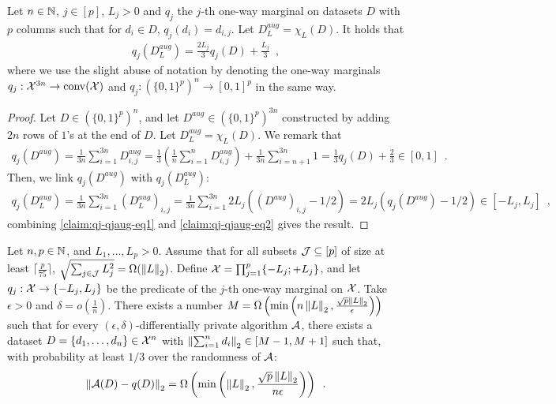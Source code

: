 \begin{claim}
  \label{claim:qj-qjaug}
  Let $n \in \mathbb N$, $j \in [p]$, $L_j > 0$ and $q_j$ the $j$-th one-way marginal
  on datasets $D$ with $p$ columns such that for $d_i \in D$, $q_j(d_i) = d_{i,j}$.
  Let $D_L^{aug} = \chi_L(D)$.
  It holds that
  \begin{align}
    q_j(D_L^{aug}) = \frac{2L_j}{3} q_j(D) + \frac{L_j}{3}\enspace,
  \end{align}
  where we use the slight abuse of notation by denoting the one-way marginals
  $q_j : \mathcal X^{3n} \rightarrow \operatorname{conv}(\mathcal X)$
  and $q_j : (\{0, 1\}^p)^n \rightarrow [0, 1]^p$ in the same way.
\end{claim}

\begin{proof}
  Let $D \in (\{0, 1\}^p)^n$, and let $D^{aug} \in (\{0, 1\}^p)^{3n}$
  constructed by
  adding $2n$ rows of $1$'s at the end of $D$. Let $D_L^{aug} = \chi_L(D)$.
  We remark that
  \begin{align}
    \label{claim:qj-qjaug-eq1}
    q_j(D^{aug})
    = \frac{1}{3n} \sum_{i=1}^{3n} D^{aug}_{i,j}
    = \frac{1}{3} \left(\frac{1}{n} \sum_{i=1}^n D^{aug}_{i,j} \right)
    + \frac{1}{3n} \sum_{i=n+1}^{3n} 1
    = \frac{1}{3} q_j(D) + \frac{2}{3} \in [0, 1]\enspace.
  \end{align}
  Then, we link $q_j(D^{aug})$ with $q_j(D^{aug}_L)$:
  \begin{align}
    \label{claim:qj-qjaug-eq2}
    q_j(D^{aug}_L)
    = \frac{1}{3n} \sum_{i=1}^{3n} (D_L^{aug})_{i,j}
    = \frac{1}{3n} \sum_{i=1}^{3n} 2L_j((D^{aug})_{i,j} - 1/2)
    = 2L_j (q_j(D^{aug}) - 1/2) \in [-L_j, L_j]\enspace,
  \end{align}
  combining \eqref{claim:qj-qjaug-eq1} and \eqref{claim:qj-qjaug-eq2} gives the
  result.
\end{proof}


\begin{theorem}
  \label{thm:lower-bound-one-way-marginals}
  Let $n, p \in \mathbb N$, and $L_1, \dots, L_p > 0$.
  Assume that for all subsets $\mathcal J \subseteq [p]$ of size at least $\lceil \frac{p}{75} \rceil$,
  $\sqrt{\sum_{j\in\mathcal J} L_j^2} = \Omega(\left \lVert L \right \rVert_2)$.
  Define $\mathcal X = \prod_{j=1}^p \{-L_j; +L_j\}$, and let $q_j : \mathcal X \rightarrow \{-L_j, L_j\}$
  be the predicate of the $j$-th one-way marginal on $\mathcal X$.
  Take $\epsilon > 0$ and $\delta = o(\frac{1}{n})$.
  There exists a number $M = \Omega\left(\min\left(n \left \lVert L \right \rVert_2, \frac{\sqrt{p} \left \lVert L \right \rVert_2}{\epsilon}\right)\right)$
  such that for every $(\epsilon,\delta)$-differentially private algorithm $\mathcal A$,
  there exists a dataset $D = \{d_1, \dots, d_n\} \in \mathcal X^n$ with $\left \lVert \sum_{i=1}^n d_i \right \rVert_2 \in [M-1, M+1]$
  such that, with probability at least $1/3$ over the randomness of $\mathcal A$:
  \begin{align}
    \left \lVert \mathcal A(D) - q(D) \right \rVert_2 = \Omega\left(\min\left(\left \lVert L \right \rVert_2, \frac{\sqrt{p} \left \lVert L \right \rVert_2}{n \epsilon}\right)\right)\enspace.
  \end{align}
\end{theorem}

